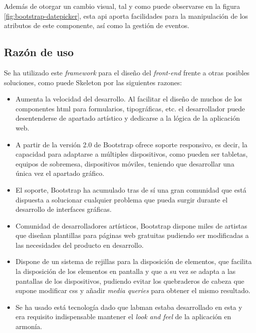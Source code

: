 Además de otorgar un cambio visual, tal y como puede observarse en la figura \ref{fig:bootstrap-datepicker}, esta \acrshort{api} aporta facilidades para la manipulación de los atributos de este componente, así como la gestión de eventos.

\subsection{Razón de uso}

Se ha utilizado este \textit{framework} para el diseño del \textit{front-end} frente a otras posibles soluciones, como puede Skeleton\cite{Skeleton} por las siguientes razones:

\begin{itemize}
	\item Aumenta la velocidad del desarrollo. Al facilitar el diseño de muchos de los componentes \acrshort{html} para formularios, tipográficas, etc. el desarrollador puede desentenderse de apartado artístico y dedicarse a la lógica de la aplicación web.
	\item A partir de la versión 2.0 de Bootstrap ofrece soporte responsivo, es decir, la capacidad para adaptarse a múltiples dispositivos, como pueden ser tabletas, equipos de sobremesa, dispositivos móviles, teniendo que desarrollar una única vez el apartado gráfico.
	\item El soporte, Bootstrap ha acumulado tras de sí una gran comunidad que está dispuesta a solucionar cualquier problema que pueda surgir durante el desarrollo de interfaces gráficas.
	\item Comunidad de desarrolladores artísticos, Bootstrap dispone miles de artistas que diseñan plantillas para páginas web gratuitas pudiendo ser modificadas a las necesidades del producto en desarrollo.
	\item Dispone de un sistema de rejillas para la disposición de elementos, que facilita la disposición de los elementos en pantalla y que a su vez se adapta a las pantallas de los dispositivos, pudiendo evitar los quebraderos de cabeza que supone modificar \acrshort{css} y añadir \textit{media queries} para obtener el mismo resultado.
	\item Se ha usado está tecnología dado que \acrshort{labman} estaba desarrollado en esta y era requisito indispensable mantener el \textit{look and feel} de la aplicación en armonía.
\end{itemize}
